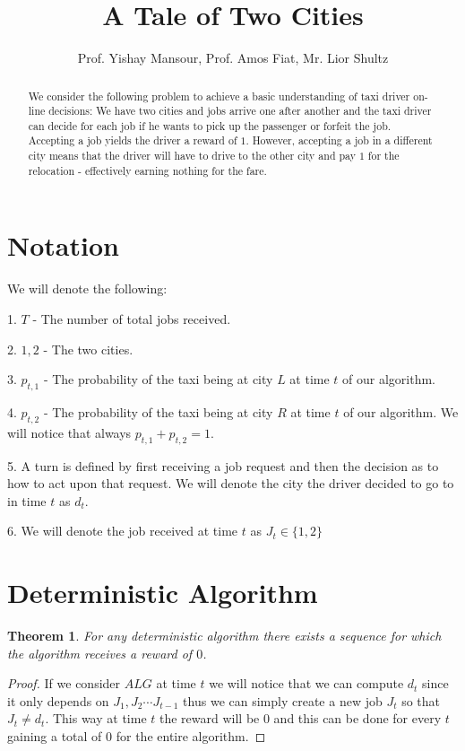 \documentclass[]{article}
\title{A Tale of Two Cities}
\author{Prof. Yishay Mansour, Prof. Amos Fiat, Mr. Lior Shultz}
\newtheorem{theorem}{Theorem}
\begin{document}
\maketitle

\begin{abstract}

We consider the following problem to achieve a basic understanding of taxi driver on-line decisions:
	We have two cities and jobs arrive one after another and the taxi driver can decide for each job if he wants to pick up the passenger or forfeit the job.
	Accepting a job yields the driver a reward of $ 1 $. However, accepting a job in a different city means that the driver will have to drive to the other city and pay $ 1 $ for the relocation - effectively earning nothing for the fare.

\end{abstract}

\section{Notation}

We will denote the following:

1. $ T $ - The number of total jobs received.

2. $ 1 , 2 $ - The two cities.

3. $ p_{t,1} $ - The probability of the taxi being at city $ L $ at time $ t $ of our algorithm.

4. $ p_{t,2} $ - The probability of the taxi being at city $ R $ at time $ t $ of our algorithm. We will notice that always $ p_{t,1} + p_{t,2} = 1 $.

5. A turn is defined by first receiving a job request and then the decision as to how to act upon that request. We will denote the city the driver decided to go to in time $ t $ as $ d_t $.

6. We will denote the job received at time $ t $ as $ J_t \in \{1,2\} $ 

\section{Deterministic Algorithm}

\begin{theorem}
	For any deterministic algorithm there exists a sequence for which the algorithm receives a reward of $ 0 $.
\end{theorem}

\begin{proof}
	If we consider $ ALG $ at time $ t $ we will notice that we can compute $ d_t $ since it only depends on $ J_1,J_2 \cdots J_{t-1} $ thus we can simply create a new job $ J_t $ so that $ J_t \neq d_t $. This way at time $ t $ the reward will be $ 0 $ and this can be done for every $ t $ gaining a total of $ 0 $ for the entire algorithm.
\end{proof}
\end{document}
